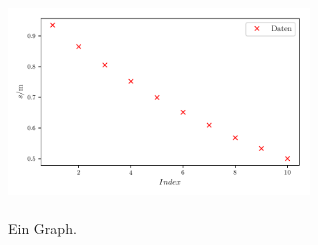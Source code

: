 \begin{frame}
    \begin{figure}   
    
    \centering
    \includegraphics[width=8cm, height=6cm]{build/plot5a.pdf}
    \caption{Ein Graph.} 

    \label{fig:plot5}
\end{figure}
\end{frame}

